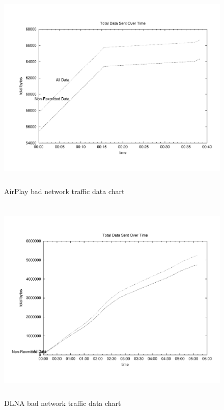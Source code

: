 \begin{figure}[htb]
\centering \includegraphics[height=10cm]{charts/badnetwork_airplay_traffic_data}
\caption{AirPlay bad network traffic data chart \label{chart6}}
\end{figure}
\begin{figure}[htb]
\centering \includegraphics[height=10cm]{charts/badnetwork_dlna_traffic_data}
\caption{DLNA bad network traffic data chart \label{chart6}}
\end{figure}


